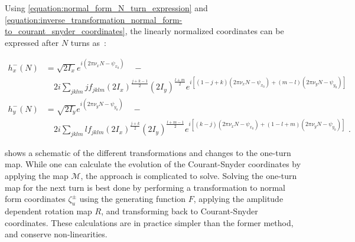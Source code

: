 Using \cref{equation:normal_form_N_turn_expression} and \cref{equation:inverse_transformation_normal_form-to_courant_snyder_coordinates}, the linearly normalized coordinates can be expressed after \(N\) turns as~\cite{CERN:Bartolini:Normal_Form_Tracking_Beam_Data}:

\begin{equation}
    \begin{aligned}
        h_x^{-}(N) & = \sqrt{2 I_x} e^{i \left( 2 \pi \nu_x N - \psi_{x_0} \right)} \quad - \\
        & \quad 2 i \sum_{jklm} j f_{jklm} \left( 2 I_x \right)^{\frac{j+k-1}{2}} \left( 2 I_y \right)^{\frac{l+m}{2}}   e^{i \left[ (1-j+k) \left( 2 \pi \nu_x N-\psi_{x_0} \right) + (m-l)   \left( 2 \pi \nu_y N - \psi_{y_0} \right) \right]} \\
        h_y^{-}(N) & = \sqrt{2 I_y} e^{i \left( 2 \pi \nu_y N - \psi_{y_0} \right)} \quad - \\
        & \quad 2 i \sum_{jklm} l f_{jklm} \left( 2 I_x \right)^{\frac{j+k}{2}}   \left( 2 I_y \right)^{\frac{l+m-1}{2}} e^{i \left[ (k-j)   \left( 2 \pi \nu_x N-\psi_{x_0} \right) + (1-l+m) \left( 2 \pi \nu_y N - \psi_{y_0} \right) \right]} \text{ .}
    \end{aligned}
    \label{equation:linearly_normalized_coordinates_after_N_turns}
\end{equation}


 shows a schematic of the different transformations and changes to the one-turn map.
While one can calculate the evolution of the Courant-Snyder coordinates by applying the map \( \mathcal{M} \), the approach is complicated to solve.
Solving the one-turn map for the next turn is best done by performing a transformation to normal form coordinates \(\zeta_{u}^{\pm}\) using the generating function \(F\), applying the amplitude dependent rotation map \(R\), and transforming back to Courant-Snyder coordinates.
These calculations are in practice simpler than the former method, and conserve non-linearities.

